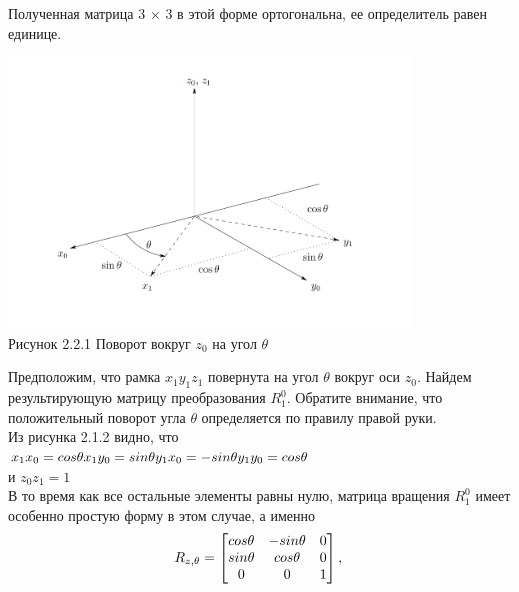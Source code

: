 \hspace*{\parindent}Полученная матрица 3 × 3 в этой форме ортогональна, ее определитель равен единице. 
\begin{center}
    \includegraphics[width=0.8\textwidth]{Lab3/pictures/rotation.png}\\
    Рисунок 2.2.1 Поворот вокруг $z_0$ на угол $\theta$\\
\end{center}
\hspace*{\parindent}Предположим, что рамка $x_1y_1z_1$ повернута на угол $\theta$ вокруг оси $z_0$.
Найдем результирующую матрицу преобразования $R_1^0$. Обратите внимание, что положительный поворот угла $\theta$ определяется по правилу правой руки.\\
\hspace*{\parindent}Из рисунка 2.1.2 видно, что\\
$x_1x_0 = cos\theta\\
x_1y_0 = sin\theta\\ 
y_1x_0 = -sin\theta\\
y_1y_0 = cos\theta$\\
и $z_0z_1 = 1$\\
\hspace*{\parindent}В то время как все остальные элементы равны нулю, матрица вращения $R_1^0$ имеет особенно простую форму в этом случае, а именно\\
\begin{equation*}\label{eq:model}
R_{z, \theta} = 
     \begin{bmatrix}
   
    cos\theta & -sin\theta & 0\\
    sin\theta & cos\theta & 0\\
    0 & 0 & 1\\
    \end{bmatrix}
    , \\
\end{equation*} 


